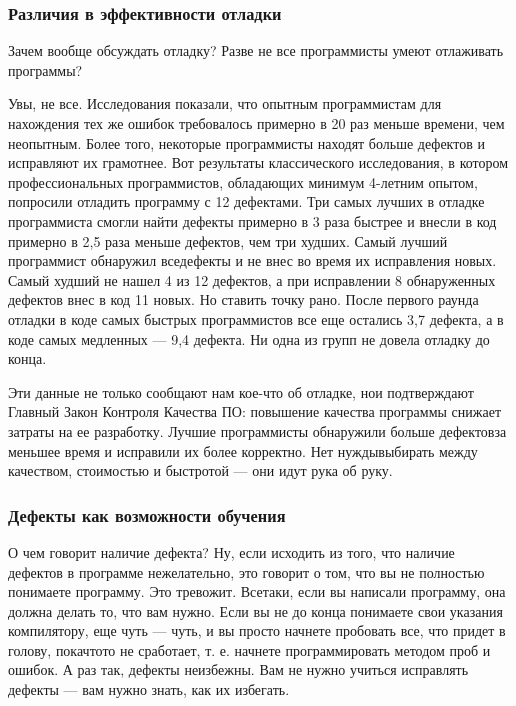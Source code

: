 \documentclass[a4paper]{article}
\begin{document}
\subsubsection{Различия в эффективности отладки}

Зачем  вообще  обсуждать  отладку?  Разве  не  все  программисты  умеют  отлаживать программы?

Увы, не все. Исследования показали, что опытным программистам для нахождения  тех  же  ошибок  требовалось  примерно  в  20  раз  меньше  времени, чем неопытным. Более того, некоторые программисты находят больше дефектов  и  исправляют  их  грамотнее.  Вот  результаты  классического  исследования,  в  котором  профессиональных  программистов,  обладающих  минимум  4-летним  опытом,  попросили  отладить  программу  с  12  дефектами. Три  самых  лучших  в  отладке  программиста  смогли  найти  дефекты  примерно  в  3  раза  быстрее  и  внесли  в  код  примерно  в  2,5  раза  меньше  дефектов,  чем  три  худших.  Самый  лучший  программист  обнаружил  вседефекты  и  не  внес  во  время  их  исправления  новых.  Самый  худший  не  нашел  4  из 12  дефектов,  а  при  исправлении  8  обнаруженных  дефектов  внес  в  код  11  новых. Но ставить точку рано. После первого раунда отладки в коде самых быстрых программистов все еще остались 3,7 дефекта, а в коде самых медленных — 9,4 дефекта.  Ни  одна  из  групп  не  довела  отладку  до  конца.

Эти  данные  не  только  сообщают  нам  кое-что  об  отладке,  нои  подтверждают  Главный  Закон  Контроля  Качества  ПО:  повышение  качества  программы  снижает  затраты  на  ее  разработку.  Лучшие  программисты  обнаружили  больше  дефектовза меньшее время и исправили их более корректно. Нет нуждывыбирать  между  качеством,  стоимостью  и  быстротой  —  они  идут  рука  об  руку.

\subsubsection{Дефекты как возможности обучения}

О  чем  говорит  наличие  дефекта?  Ну,  если  исходить  из  того,  что  наличие  дефектов  в  программе  нежелательно,  это  говорит  о  том,  что  вы  не  полностью  понимаете  программу.  Это  тревожит.  Всетаки,  если  вы  написали  программу,  она  должна делать то, что вам нужно. Если вы не до конца понимаете свои указания компилятору, еще чуть --- чуть, и вы просто начнете пробовать все, что придет в голову, покачтото не сработает, т. е. начнете программировать методом проб и ошибок. А раз так,  дефекты  неизбежны.  Вам  не  нужно  учиться  исправлять  дефекты  —  вам  нужно  знать,  как  их  избегать.
\end{document}
